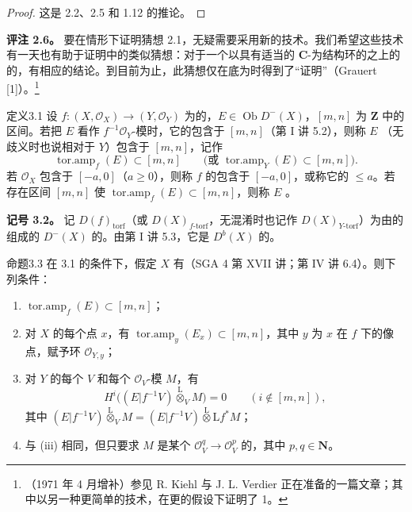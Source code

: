 \begin{proof}这是 2.2、2.5 和 1.12 的推论。\end{proof}
\textbf{评注 2.6。} 要在情形下证明猜想 2.1，无疑需要采用新的技术。我们希望这些技术有一天也有助于证明中的类似猜想：对于一个以具有适当的 $\mathbf C$-为结构环的之上的的，有相应的结论。到目前为止，此猜想仅在底为时得到了“证明”（Grauert  [1]）。\footnote{（1971 年 4 月增补）参见 R. Kiehl 与 J. L. Verdier 正在准备的一篇文章；其中以另一种更简单的技术，在更的假设下证明了 1。}
\begin{SGAresult}{定义}{3.1}
设 $f:(X,\mathcal O_X)\to(Y,\mathcal O_Y)$ 为的，$E\in\operatorname{Ob}D^-(X)$，$[m,n]$ 为 $\mathbf Z$ 中的区间。若把 $E$ 看作 $f^{-1}\mathcal O_Y$-模时，它的包含于 $[m,n]$（第 I 讲 5.2），则称 $E$ （无歧义时也说相对于 $Y$）包含于 $[m,n]$，记作
\[\operatorname{tor.amp}_f(E)\subset[m,n]\qquad\bigl(\text{或 }\operatorname{tor.amp}_Y(E)\subset[m,n]\bigr).\]
若 $\mathcal O_X$ 包含于 $[-a,0]$（$a\ge0$），则称 $f$ 的包含于 $[-a,0]$，或称它的 $\le a$。若存在区间 $[m,n]$ 使 $\operatorname{tor.amp}_f(E)\subset[m,n]$，则称 $E$ 。
\end{SGAresult}
\textbf{记号 3.2。} 记 $D(f)_{\mathrm{torf}}$（或 $D(X)_{f\text{-torf}}$，无混淆时也记作 $D(X)_{Y\text{-torf}}$）为由的组成的 $D^-(X)$ 的。由第 I 讲 5.3，它是 $D^b(X)$ 的。
\begin{SGAresult}{命题}{3.3}
在 3.1 的条件下，假定 $X$ 有（SGA 4 第 XVII 讲；第 IV 讲 6.4）。则下列条件：
\begin{enumerate}
\item[(i)] $\operatorname{tor.amp}_f(E)\subset[m,n]$；
\item[(ii)] 对 $X$ 的每个点 $x$，有 $\operatorname{tor.amp}_y(E_x)\subset[m,n]$，其中 $y$ 为 $x$ 在 $f$ 下的像点，赋予环 $\mathcal O_{Y,y}$；
\item[(iii)] 对 $Y$ 的每个 $V$ 和每个 $\mathcal O_V$-模 $M$，有
\[H^i\bigl((E|f^{-1}V)\mathbin{\overset{\mathrm L}{\otimes}}_VM\bigr)=0\qquad(i\notin[m,n]),\]
其中 $(E|f^{-1}V)\mathbin{\overset{\mathrm L}{\otimes}}_VM=(E|f^{-1}V)\mathbin{\overset{\mathrm L}{\otimes}}\mathrm Lf^*M$；
\item[(iv)] 与 (iii) 相同，但只要求 $M$ 是某个 $\mathcal O_V^q\to\mathcal O_V^p$ 的，其中 $p,q\in\mathbf N$。
\end{enumerate}
\end{SGAresult}

